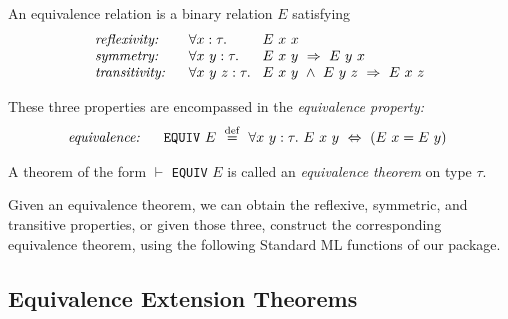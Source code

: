 \documentclass[envcountsame,runningheads]{llncs}
\def\defeq{\stackrel{\mathrm{def}}{=}}
\begin{document}
An equivalence relation is a binary relation $E$ satisfying
$$
\begin{array}{l@{\hspace{0.6cm}}l@{\hspace{0.3cm}}l}
\mbox{\it reflexivity:} &
\forall x:\tau . & E\ x\ x \\
\mbox{\it symmetry:} &
\forall x\ y :\tau. & E\ x\ y \ \Rightarrow \ E\ y\ x \\
\mbox{\it transitivity:} &
\forall x\ y\ z:\tau. & E\ x\ y \ \wedge \ E\ y\ z \ \Rightarrow \ E\ x\ z
\end{array}
$$

These three properties are encompassed in
the {\it equivalence property:}
$$
\begin{array}[t]{l@{\hspace{0.6cm}}l@{\hspace{0.3cm}}}
\mbox{\it equivalence:} &
\mbox{\tt EQUIV}\ E \ \defeq \ 
\forall x\ y :\tau.\ E\ x\ y \ \Leftrightarrow \ (E\ x = E\ y)
\end{array}
$$

\noindent
A theorem of the form
$\vdash$ {\tt EQUIV} $E$
is called an {\it equivalence theorem\/} on type $\tau$.

Given an equivalence theorem, we can obtain the reflexive, symmetric,
and transitive properties, or given those three, construct the corresponding
equivalence theorem, using the following Standard ML functions of our package.
\begin{center}
\end{center}

%
\subsection{Equivalence Extension Theorems}
%
\label{condequivs}
\end{document}
